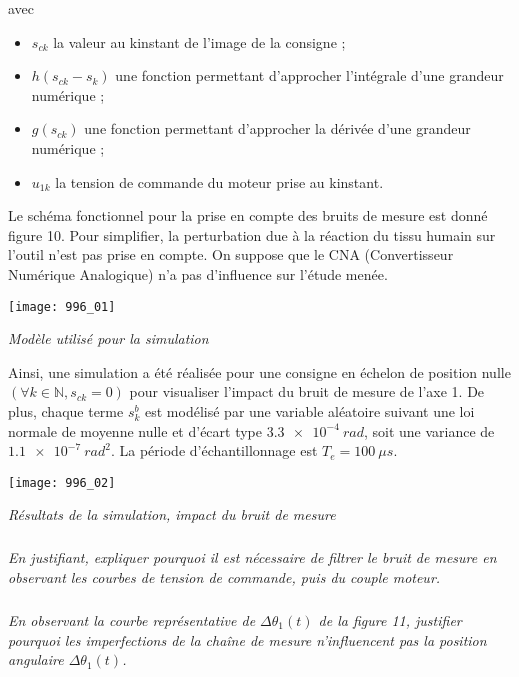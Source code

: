 avec
\begin{itemize}
\item $s_{ck}$ la valeur au k\ieme instant de l’image de la consigne ;
\item $h\left(s_{ck}-s_k \right)$ une fonction permettant d’approcher l’intégrale d’une grandeur numérique ;
\item $g\left(s_{ck}\right)$ une fonction permettant d’approcher la dérivée d’une grandeur numérique ;
\item $u_{1k}$ la tension de commande du moteur prise au k\ieme instant.
\end{itemize}
Le schéma fonctionnel pour la prise en compte des bruits de mesure est donné figure 10. Pour simplifier, la
perturbation due à la réaction du tissu humain sur l’outil n’est pas prise en compte. On suppose que le CNA
(Convertisseur Numérique Analogique) n’a pas d’influence sur l’étude menée.

\begin{center}

\texttt{[image: 996\_01]}

\textit{Modèle utilisé pour la simulation}
\end{center}


Ainsi, une simulation a été réalisée pour une consigne en échelon de position nulle $(\forall k \in \mathbb{N}, s_{ck}=0)$
pour visualiser l’impact du bruit de mesure de l’axe 1. De plus, chaque terme $s_k^b$
est modélisé par une variable aléatoire suivant une loi normale de moyenne nulle et d’écart type $\SI{3,3e-4}{rad}$, soit une variance de $\SI{1,1e-7}{rad^2}$. La période d’échantillonnage est $T_e = \SI{100}{\mu s}$.


\begin{center}

\texttt{[image: 996\_02]}

\textit{Résultats de la simulation, impact du bruit de mesure}
\end{center}



\subparagraph{}
\textit{En justifiant, expliquer pourquoi il est nécessaire de filtrer le bruit de mesure en observant les courbes
de tension de commande, puis du couple moteur.}
\ifprof
\begin{corrige}
\end{corrige}
\else
\fi


\subparagraph{}
\textit{En observant la courbe représentative de $\Delta\theta_1(t)$ de la figure 11, justifier pourquoi les imperfections de
la chaîne de mesure n’influencent pas la position angulaire $\Delta\theta_1(t)$.}
\ifprof
\begin{corrige}
\end{corrige}
\else
\fi


